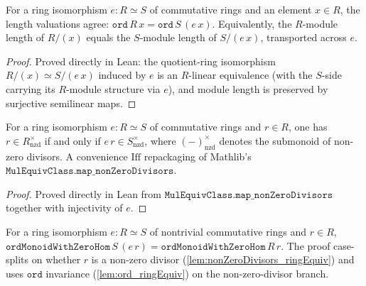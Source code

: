 \begin{lemma}

  \label{lem:ord_ringEquiv}
  For a ring isomorphism \(e \colon R \simeq S\) of commutative rings and an
  element \(x \in R\), the length valuations agree:
  \(\texttt{ord}\,R\,x = \texttt{ord}\,S\,(e\,x)\). Equivalently, the
  \(R\)-module length of \(R/(x)\) equals the \(S\)-module length of
  \(S/(e\,x)\), transported across \(e\).
\end{lemma}
\begin{proof}
  Proved directly in Lean: the quotient-ring isomorphism
  \(R/(x) \simeq S/(e\,x)\) induced by \(e\) is an \(R\)-linear equivalence
  (with the \(S\)-side carrying its \(R\)-module structure via \(e\)), and
  module length is preserved by surjective semilinear maps.
\end{proof}
\begin{lemma}

  \label{lem:nonZeroDivisors_ringEquiv}
  For a ring isomorphism \(e \colon R \simeq S\) of commutative rings and
  \(r \in R\), one has \(r \in R^{\times}_{\mathrm{nzd}}\) if and only if
  \(e\,r \in S^{\times}_{\mathrm{nzd}}\), where \((-)^{\times}_{\mathrm{nzd}}\)
  denotes the submonoid of non-zero divisors. A convenience \(\mathrm{Iff}\)
  repackaging of Mathlib's \(\texttt{MulEquivClass.map\_nonZeroDivisors}\).
\end{lemma}
\begin{proof}
  Proved directly in Lean from \(\texttt{MulEquivClass.map\_nonZeroDivisors}\)
  together with injectivity of \(e\).
\end{proof}
\begin{lemma}

  \label{lem:ordMonoidWithZeroHom_ringEquiv}
  For a ring isomorphism \(e \colon R \simeq S\) of nontrivial commutative
  rings and \(r \in R\),
  \(\texttt{ordMonoidWithZeroHom}\,S\,(e\,r)
   = \texttt{ordMonoidWithZeroHom}\,R\,r\). The proof case-splits on whether
  \(r\) is a non-zero divisor (\ref{lem:nonZeroDivisors_ringEquiv}) and uses
  \(\texttt{ord}\) invariance (\ref{lem:ord_ringEquiv}) on the non-zero-divisor
  branch.
\end{lemma}
